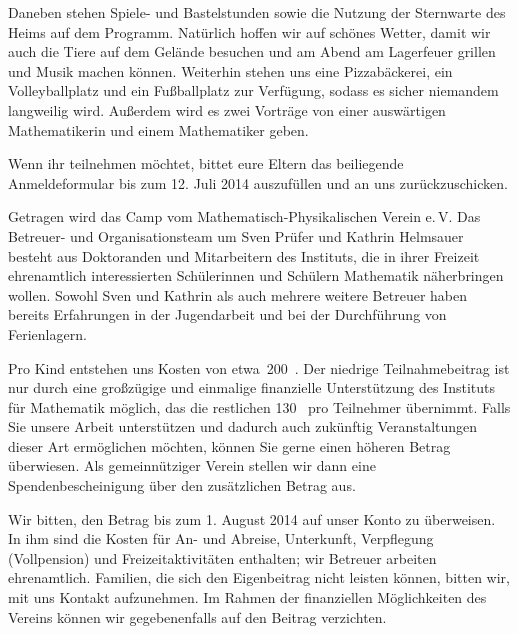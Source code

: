 \documentclass[12pt]{zettel}
\begin{document}
Daneben stehen Spiele- und Bastelstunden sowie die Nutzung der
Sternwarte des Heims auf dem Programm. Natürlich hoffen wir auf
schönes Wetter, damit wir auch die Tiere auf dem Gelände besuchen
und am Abend am Lagerfeuer grillen und Musik machen können.
Weiterhin stehen uns eine Pizzabäckerei, ein Volleyballplatz und ein
Fußballplatz zur Verfügung, sodass es sicher niemandem langweilig
wird. Außerdem wird es zwei Vorträge von
einer auswärtigen Mathematikerin und einem Mathematiker geben.

\vspace{\medskipamount}

\begin{minipage}{0.6\textwidth}
Wenn ihr teilnehmen möchtet, bittet eure Eltern das beiliegende Anmeldeformular
bis zum 12. Juli 2014 auszufüllen und an uns zurückzuschicken.
\end{minipage}

\newpage

Getragen wird das Camp vom Mathematisch-Physikalischen Verein e.\,V. Das
Betreuer- und Organisationsteam um Sven Prüfer und Kathrin Helmsauer besteht
aus Doktoranden und Mitarbeitern des Instituts, die in ihrer Freizeit
ehrenamtlich interessierten Schülerinnen und Schülern Mathematik näherbringen
wollen. Sowohl Sven und Kathrin als auch mehrere weitere Betreuer haben
bereits Erfahrungen in der Jugendarbeit und bei der Durch\-füh\-rung von
Ferienlagern.

Pro Kind entstehen uns Kosten von etwa~200~\texteuro. Der niedrige
Teilnahmebeitrag ist nur durch eine großzügige und einmalige finanzielle
Unterstützung des Instituts für Mathematik möglich, das die restlichen
130~\texteuro{} pro Teilnehmer übernimmt.  Falls Sie unsere Arbeit unterstützen
und dadurch auch zukünftig Veranstaltungen dieser Art ermöglichen möchten,
können Sie gerne einen höheren Betrag überwiesen. Als gemeinnütziger Verein
stellen wir dann eine Spendenbescheinigung über den zusätzlichen Betrag aus.

Wir bitten, den Betrag bis zum 1. August 2014 auf unser Konto zu überweisen.
In ihm sind die Kosten für An- und Abreise, Unterkunft, Verpflegung
(Vollpension) und Freizeitaktivitäten enthalten; wir Betreuer arbeiten
ehrenamtlich. Familien, die sich den Eigenbeitrag nicht leisten können, bitten
wir, mit uns Kontakt aufzunehmen. Im Rahmen der finanziellen Möglichkeiten des
Vereins können wir gegebenenfalls auf den Beitrag verzichten.
\end{document}
